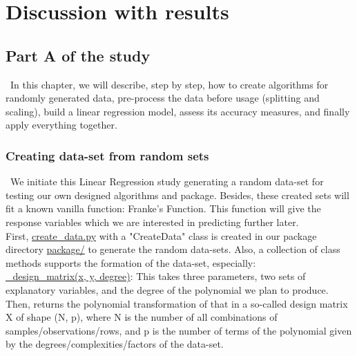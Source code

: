 \section{Discussion with results}

\subsection{Part A of the study}
\label{chap:Part A of the study}

\quad \, In this chapter, we will describe, step by step, how to create algorithms for randomly generated data, pre-process the data before usage (splitting and scaling), build a linear regression model, assess its accuracy measures, and finally apply everything together.\\

\subsubsection{Creating data-set from random sets}
\label{chap:Creating data-set from random sets}

\quad \, We initiate this Linear Regression study generating a random data-set for testing our own designed algorithms and package. Besides, these created sets will fit a known vanilla function: Franke's Function. This function will give the response variables which we are interested in predicting further later.\\

First, \href{https://github.com/fabiorodp/UiO-FYS-STK4155/blob/master/Project1/package/Create_data.py}{create\_data.py} with a "CreateData" class is created in our package directory \href{https://github.com/fabiorodp/UiO-FYS-STK4155/tree/master/Project1/package}{package/} to generate the random data-sets. Also, a collection of class methods supports the formation of the data-set, especially:\\

\href{https://github.com/fabiorodp/UiO-FYS-STK4155/blob/master/Project1/package/Create_data.py}{\_design\_matrix(x, y, degree)}: This takes three parameters, two sets of explanatory variables, and the degree of the polynomial we plan to produce. Then, returns the polynomial transformation of that in a so-called design matrix X of shape (N, p), where N is the number of all combinations of samples/observations/rows, and p is the number of terms of the polynomial given by the degrees/complexities/factors of the data-set.\\

